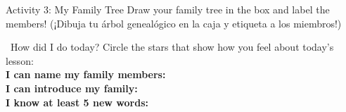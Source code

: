 \begin{activity}{Activity 3: My Family Tree}
  Draw your family tree in the box and label the members! (¡Dibuja tu árbol genealógico en la caja y etiqueta a los miembros!)\\[1em]
  \framebox[\textwidth]{\rule{0pt}{8cm}}
\end{activity}

\vspace{1em}
\begin{grammartip}{ \ How did I do today?}
  Circle the stars that show how you feel about today's lesson:\\[6pt]
  \textbf{I can name my family members:} \selfcheck[0] \\[4pt]
  \textbf{I can introduce my family:} \selfcheck[0] \\[4pt]
  \textbf{I know at least 5 new words:} \selfcheck[0]
\end{grammartip}
